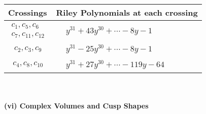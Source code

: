 \documentclass[1p]{elsarticle_modified}
\theoremstyle{definition}
\begin{document}
\begin{tabular}{m{50pt}|m{274pt}}
Crossings & \hspace{64pt}Riley Polynomials at each crossing \\
\hline $$\begin{aligned}c_{1},c_{5},c_{6}\\c_{7},c_{11},c_{12}\end{aligned}$$&$\begin{aligned}
&y^{31}+43 y^{30}+\cdots-8 y-1
\end{aligned}$\\
\hline $$\begin{aligned}c_{2},c_{3},c_{9}\end{aligned}$$&$\begin{aligned}
&y^{31}-25 y^{30}+\cdots-8 y-1
\end{aligned}$\\
\hline $$\begin{aligned}c_{4},c_{8},c_{10}\end{aligned}$$&$\begin{aligned}
&y^{31}+27 y^{30}+\cdots-119 y-64
\end{aligned}$\\
\hline
\end{tabular}\\~\\
\newpage\flushleft \textbf{(vi) Complex Volumes and Cusp Shapes}
\end{document}
